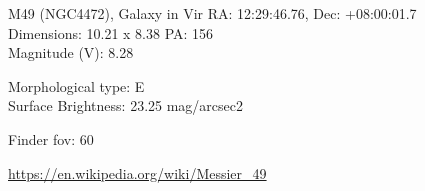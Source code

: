 \begin{block}{M49 (NGC4472), Galaxy in Vir}
    RA: 12:29:46.76, Dec: +08:00:01.7 \\ 
    Dimensions: 10.21 x 8.38 PA: 156 \\ 
    Magnitude (V): 8.28

    Morphological type: E \\ 
    Surface Brightness: 23.25 mag/arcsec2 


    Finder fov: 60 

    \url{https://en.wikipedia.org/wiki/Messier_49} 
\end{block}